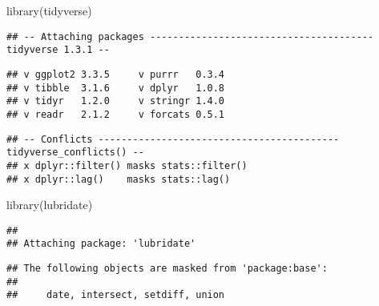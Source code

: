 \documentclass[
]{article}
\newenvironment{Shaded}{\begin{snugshade}}{\end{snugshade}}
\newcommand{\FunctionTok}[1]{\textcolor[rgb]{0.00,0.00,0.00}{#1}}
\newcommand{\NormalTok}[1]{#1}
\begin{document}
\begin{Shaded}
\begin{Highlighting}[]
\FunctionTok{library}\NormalTok{(tidyverse)}
\end{Highlighting}
\end{Shaded}

\begin{verbatim}
## -- Attaching packages --------------------------------------- tidyverse 1.3.1 --
\end{verbatim}

\begin{verbatim}
## v ggplot2 3.3.5     v purrr   0.3.4
## v tibble  3.1.6     v dplyr   1.0.8
## v tidyr   1.2.0     v stringr 1.4.0
## v readr   2.1.2     v forcats 0.5.1
\end{verbatim}

\begin{verbatim}
## -- Conflicts ------------------------------------------ tidyverse_conflicts() --
## x dplyr::filter() masks stats::filter()
## x dplyr::lag()    masks stats::lag()
\end{verbatim}

\begin{Shaded}
\begin{Highlighting}[]
\FunctionTok{library}\NormalTok{(lubridate)}
\end{Highlighting}
\end{Shaded}

\begin{verbatim}
## 
## Attaching package: 'lubridate'
\end{verbatim}

\begin{verbatim}
## The following objects are masked from 'package:base':
## 
##     date, intersect, setdiff, union
\end{verbatim}
\end{document}
